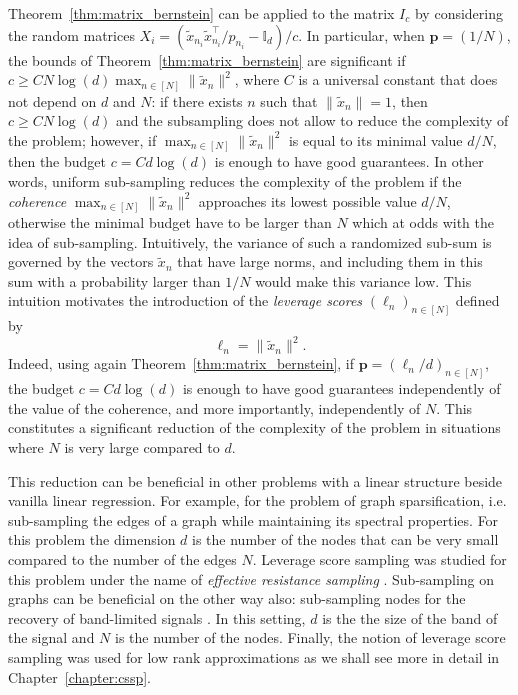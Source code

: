\documentclass[twoside,11pt]{book}
\numberwithin{theorem}{chapter}
\numberwithin{definition}{chapter}
\numberwithin{proposition}{chapter}
\numberwithin{corollary}{chapter}
\numberwithin{example}{chapter}
\numberwithin{lemma}{chapter}
\numberwithin{assumption}{chapter}
\numberwithin{equation}{chapter}
\numberwithin{figure}{chapter}
\DeclareMathOperator{\Tran}{\intercal}
\begin{document}
Theorem~\ref{thm:matrix_bernstein} can be applied to the matrix $I_{c}$ by considering the random matrices $X_{i} = (\tilde{x}_{n_{i}}\tilde{x}_{n_{i}}^{\Tran}/p_{n_{i}} - \mathbb{I}_{d})/c$. In particular, when $\bm{p} =(1/N)$, the bounds of Theorem~\ref{thm:matrix_bernstein} are significant if $c \geq C N \log(d)\max_{n \in [N]}\|\tilde{x}_n\|^{2}$, where $C$ is a universal constant that does not depend on $d$ and $N$: if there exists $n$ such that $\|\tilde{x}_{n}\|=1$, then $c \geq C N \log(d)$ and the subsampling does not allow to reduce the complexity of the problem; however, if $\max_{n \in [N]}\|\tilde{x}_n\|^{2}$ is equal to its minimal value $d/N$, then the budget $c = C d \log(d)$ is enough to have good guarantees. In other words, uniform sub-sampling reduces the complexity of the problem if the \emph{coherence} $\max_{n \in [N]}\|\tilde{x}_n\|^{2}$ approaches its lowest possible value $d/N$, otherwise the minimal budget have to be larger than $N$ which at odds with the idea of sub-sampling. Intuitively, the variance of such a randomized sub-sum is governed by the vectors $\tilde{x}_{n}$ that have large norms, and including them in this sum with a probability larger than $1/N$  would make this variance low. This intuition motivates the introduction of the \emph{leverage scores} $(\ell_{n})_{n \in [N]}$ defined by
\begin{equation}
\ell_{n} = \|\tilde{x}_{n}\|^{2}.
\end{equation}
Indeed, using again Theorem~\ref{thm:matrix_bernstein}, if $\bm{p} = (\ell_{n}/d)_{n \in [N]}$, the budget $c = C d \log(d)$ is enough to have good guarantees independently of the value of the coherence, and more importantly, independently of $N$. This constitutes a significant reduction of the complexity of the problem in situations where $N$ is very large compared to $d$. 

This reduction can be beneficial in other problems with a linear structure beside vanilla linear regression. For example, for the problem of graph sparsification, i.e. sub-sampling the edges of a graph while maintaining its spectral properties. For this problem the dimension $d$ is the number of the nodes that can be very small compared to the number of the edges $N$. Leverage score sampling was studied for this problem under the name of \emph{effective resistance sampling} \citep*{SpTe04,SpSr11}. Sub-sampling on graphs can be beneficial on the other way also: sub-sampling nodes for the recovery of band-limited signals \citep*{PuTrGrVa18}. In this setting, $d$ is the the size of the band of the signal and $N$ is the number of the nodes. Finally, the notion of leverage score sampling was used for low rank approximations \citep*{DrMaMu07} as we shall see more in detail in Chapter~\ref{chapter:cssp}.
\end{document}
